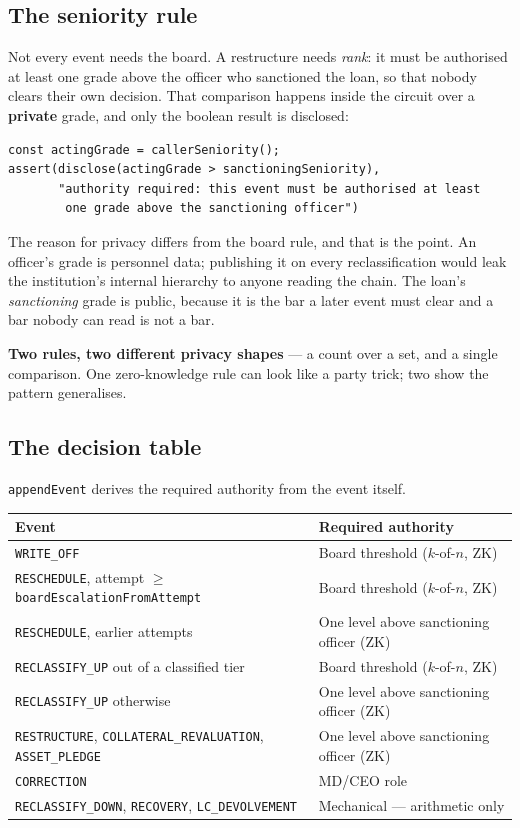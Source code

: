 \documentclass[11pt,a4paper]{article}
\begin{document}
\subsection{The seniority rule}

Not every event needs the board. A restructure needs \emph{rank}: it must be authorised at least one grade
above the officer who sanctioned the loan, so that nobody clears their own decision. That comparison
happens inside the circuit over a \textbf{private} grade, and only the boolean result is disclosed:

\begin{Verbatim}
const actingGrade = callerSeniority();
assert(disclose(actingGrade > sanctioningSeniority),
       "authority required: this event must be authorised at least
        one grade above the sanctioning officer")
\end{Verbatim}

The reason for privacy differs from the board rule, and that is the point. An officer's grade is personnel
data; publishing it on every reclassification would leak the institution's internal hierarchy to anyone
reading the chain. The loan's \emph{sanctioning} grade is public, because it is the bar a later event must
clear and a bar nobody can read is not a bar.

\textbf{Two rules, two different privacy shapes} --- a count over a set, and a single comparison. One
zero-knowledge rule can look like a party trick; two show the pattern generalises.

\subsection{The decision table}

\texttt{appendEvent} derives the required authority from the event itself.

\begin{tabularx}{\textwidth}{@{}L{0.52}L{0.48}@{}}
\toprule
\textbf{Event} & \textbf{Required authority} \\
\midrule
\texttt{WRITE\_OFF} & Board threshold ($k$-of-$n$, ZK) \\
\texttt{RESCHEDULE}, attempt $\geq$ \texttt{boardEscalationFromAttempt} & Board threshold ($k$-of-$n$, ZK) \\
\texttt{RESCHEDULE}, earlier attempts & One level above sanctioning officer (ZK) \\
\texttt{RECLASSIFY\_UP} out of a classified tier & Board threshold ($k$-of-$n$, ZK) \\
\texttt{RECLASSIFY\_UP} otherwise & One level above sanctioning officer (ZK) \\
\texttt{RESTRUCTURE}, \texttt{COLLATERAL\_REVALUATION}, \texttt{ASSET\_PLEDGE} & One level above sanctioning officer (ZK) \\
\texttt{CORRECTION} & MD/CEO role \\
\texttt{RECLASSIFY\_DOWN}, \texttt{RECOVERY}, \texttt{LC\_DEVOLVEMENT} & Mechanical --- arithmetic only \\
\bottomrule
\end{tabularx}
\end{document}
